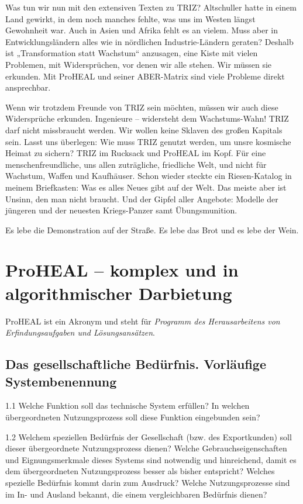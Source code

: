 \documentclass[12pt,a4paper]{article}
\begin{document}
Was tun wir nun mit den extensiven Texten zu TRIZ? Altschuller hatte in einem
Land gewirkt, in dem noch manches fehlte, was uns im Westen längst Gewohnheit
war.  Auch in Asien und Afrika fehlt es an vielem. Muss aber in
Entwicklungsländern alles wie in nördlichen Industrie-Ländern geraten? Deshalb
ist „Transformation statt Wachstum“ anzusagen, eine Kiste mit vielen Problemen,
mit Widersprüchen, vor denen wir alle stehen. Wir müssen sie erkunden. Mit
ProHEAL und seiner ABER-Matrix sind viele Probleme direkt ansprechbar.

Wenn wir trotzdem Freunde von TRIZ sein möchten, müssen wir auch diese
Widersprüche erkunden. Ingenieure – widersteht dem Wachstums-Wahn! TRIZ darf
nicht missbraucht werden. Wir wollen keine Sklaven des großen Kapitals sein.
Lasst uns überlegen: Wie muss TRIZ genutzt werden, um unsre kosmische Heimat zu
sichern? TRIZ im Rucksack und ProHEAL im Kopf. Für eine menschenfreundliche,
uns allen zuträgliche, friedliche Welt, und nicht für Wachstum, Waffen und
Kaufhäuser. Schon wieder steckte ein Riesen-Katalog in meinem Briefkasten: Was
es alles Neues gibt auf der Welt. Das meiste aber ist Unsinn, den man nicht
braucht. Und der Gipfel aller Angebote: Modelle der jüngeren und der neuesten
Kriegs-Panzer samt Übungsmunition.

Es lebe die Demonstration auf der Straße. Es lebe das Brot und es lebe der
Wein.

\section{ProHEAL – komplex und in algorithmischer Darbietung}

ProHEAL ist ein Akronym und steht für \emph{Programm des Herausarbeitens von
  Erfindungsaufgaben und Lösungsansätzen}.

\subsection{Das gesellschaftliche Bedürfnis. Vorläufige Systembenennung}

1.1 Welche Funktion soll das technische System erfüllen? In welchen
übergeordneten Nutzungsprozess soll diese Funktion eingebunden sein?

1.2 Welchem speziellen Bedürfnis der Gesellschaft (bzw. des Exportkunden) soll
dieser übergeordnete Nutzungsprozess dienen? Welche Gebrauchseigenschaften und
Eignungsmerkmale dieses Systems sind notwendig und hinreichend, damit es dem
übergeordneten Nutzungsprozess besser als bisher entspricht? Welches spezielle
Bedürfnis kommt darin zum Ausdruck? Welche Nutzungsprozesse sind im In- und
Ausland bekannt, die einem vergleichbaren Bedürfnis dienen?
\end{document}

